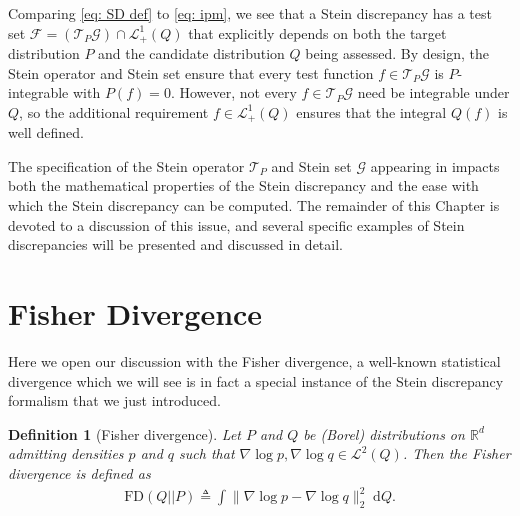 \documentclass[12pt,paper=letter]{scrreprt}
\newtheorem{definition}{Definition}[chapter]
\def\defeq{\triangleq} %
\newcommand{\gset}[0]{\mathcal{G}} %
\begin{document}
\noindent Comparing \eqref{eq: SD def} to \eqref{eq: ipm}, we see that a Stein discrepancy has a test set $\mathcal{F} = (\mathcal{T}_P \mathcal{G}) \cap \mathcal{L}^1_+(Q)$ that explicitly depends on both the target distribution $P$ and the candidate distribution $Q$ being assessed.
By design, the Stein operator and Stein set ensure that every test function $f\in\mathcal{T}_P \mathcal{G}$ is $P$-integrable with $P(f) = 0$. 
However, not every $f\in\mathcal{T}_P \mathcal{G}$ need be integrable under $Q$, so the additional requirement $f \in \mathcal{L}^1_+(Q)$ ensures that the integral $Q(f)$ is well defined.
%
%

The specification of the Stein operator $\mathcal{T}_P$ and Stein set $\gset$ appearing in  impacts both the mathematical properties of the Stein discrepancy and the ease with which the Stein discrepancy can be computed.
The remainder of this Chapter is devoted to a discussion of this issue, and several specific examples of Stein discrepancies will be presented and discussed in detail.


\section{Fisher Divergence}
\label{sec: Fisher divergence}

Here we open our discussion with the Fisher divergence, a well-known statistical divergence which we will see is in fact a special instance of the Stein discrepancy formalism that we just introduced.

\begin{definition}[Fisher divergence] \label{def: fisher div}
    Let $P$ and $Q$ be (Borel) distributions on $\mathbb{R}^d$ admitting densities $p$ and $q$ such that $\nabla \log p , \nabla \log q \in \mathcal{L}^2(Q)$.
    Then the \emph{Fisher divergence} is defined as
    \begin{align*}
        \mathrm{FD}(Q||P) \defeq \int \| \nabla \log p - \nabla \log q \|_2^2 \; \mathrm{d}Q .
    \end{align*}
\end{definition}
\end{document}
